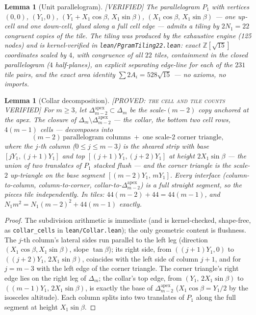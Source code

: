 \documentclass[11pt,reqno]{amsart}
\theoremstyle{plain}
\newtheorem{lemma}[theorem]{Lemma}
\theoremstyle{definition}
\newcommand{\Z}{\mathbb{Z}}
\newcommand{\lab}[1]{\hfill\textnormal{\footnotesize\textsc{[#1]}}}
\begin{document}
\begin{lemma}[Unit parallelogram]\label{lem:pgram}\lab{VERIFIED}
The parallelogram $P_1$ with vertices $(0,0)$, $(Y_1,0)$,
$(Y_1+X_1\cos\beta,\,X_1\sin\beta)$, $(X_1\cos\beta,\,X_1\sin\beta)$ --- one up-cell and one
down-cell, glued along a full cell edge --- admits a tiling by $2N_1=22$ congruent copies of the
tile. The tiling was produced by the exhaustive engine (125 nodes) and is kernel-verified in
\textup{\texttt{lean/PgramTiling22.lean}}: exact $\Z[\sqrt{15}]$ coordinates scaled by $4$, with
congruence of all $22$ tiles, containment in the closed parallelogram ($4$ half-planes), an
explicit separating edge-line for each of the $231$ tile pairs, and the exact area identity
$\sum 2A_i = 528\sqrt{15}$ --- no axioms, no imports.
\end{lemma}

\begin{lemma}[Collar decomposition]\label{lem:collar}\lab{PROVED: the cell and tile counts VERIFIED}
For $m\ge 3$, let $\Delta_{m-2}^{\mathrm{apex}}\subset\Delta_m$ be the scale-$(m-2)$ copy anchored
at the apex. The closure of $\Delta_m\setminus\Delta_{m-2}^{\mathrm{apex}}$ --- the \emph{collar},
the bottom two cell rows, $4(m-1)$ cells --- decomposes into
\[
(m-2)\ \text{parallelogram columns} \;+\; \text{one scale-2 corner triangle},
\]
where the $j$-th column ($0\le j\le m-3$) is the sheared strip with base
$[jY_1,(j+1)Y_1]$ and top $[(j+1)Y_1,(j+2)Y_1]$ at height $2X_1\sin\beta$ --- the union of two
translates of $P_1$ stacked flush --- and the corner triangle is the scale-$2$ up-triangle on the
base segment $[(m-2)Y_1,\,mY_1]$. Every interface (column-to-column, column-to-corner,
collar-to-$\Delta_{m-2}^{\mathrm{apex}}$) is a full straight segment, so the pieces tile
independently. In tiles: $44(m-2)+44=44(m-1)$, and
$N_1 m^2 = N_1(m-2)^2 + 44(m-1)$ exactly.
\end{lemma}

\begin{proof}
The subdivision arithmetic is immediate (and is kernel-checked, shape-free, as
\texttt{collar\_cells} in \textup{\texttt{lean/Collar.lean}}); the only geometric content is
flushness. The $j$-th column's lateral sides run parallel to the left leg (direction
$(X_1\cos\beta, X_1\sin\beta)$, slope $\tan\beta$); its right side, from $((j+1)Y_1,0)$ to
$((j+2)Y_1,\,2X_1\sin\beta)$, coincides with the left side of column $j+1$, and for $j=m-3$ with
the left edge of the corner triangle. The corner triangle's right edge lies on the right leg of
$\Delta_m$; the collar's top edge, from $(Y_1,\,2X_1\sin\beta)$ to $((m-1)Y_1,\,2X_1\sin\beta)$,
is exactly the base of $\Delta_{m-2}^{\mathrm{apex}}$ ($X_1\cos\beta=Y_1/2$ by the isosceles
altitude). Each column splits into two translates of $P_1$ along the full segment at height
$X_1\sin\beta$.
\end{proof}
\end{document}
